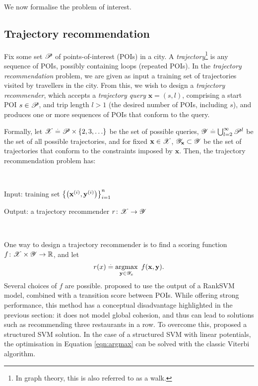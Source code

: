 
We now formalise the problem of interest.

%
\subsection{Trajectory recommendation}

Fix some set $\mathscr{P}$ of points-of-interest (POIs) in a city.
A \emph{trajectory}\footnote{In graph theory, this is also referred to as a walk.} is any sequence of POIs, possibly containing loops (repeated POIs).
In the \emph{trajectory recommendation} problem, we are given as input a training set of trajectories visited by travellers in the city.
From this, we wish to design a \emph{trajectory recommender}, which accepts a
\emph{trajectory query} $\mathbf{x} = (s, l)$, comprising a start POI $s \in \mathscr{P}$, and trip length $l \!>\! 1$ (\ie the desired number of POIs, including $s$),
and produces one or more sequences of POIs that conform to the query.

Formally, let $\mathscr{X} \stackrel{.}{=} \mathscr{P} \times \{ 2, 3, \ldots \}$ be the set of possible queries,
$\mathscr{Y} \stackrel{.}{=} \bigcup_{l = 2}^\infty \mathscr{P}^l$ be the set of all possible trajectories,
and for fixed $\mathbf{x} \in \mathscr{X}$, $\mathscr{Y}_{\mathbf{x}} \subset \mathscr{Y}$ be the set of trajectories that conform to the constraints imposed by $\mathbf{x}$.
Then, the {trajectory recommendation} problem has:

\

{\sc Input}: training set $\left\{ \left( \mathbf{x}^{(i)}, \mathbf{y}^{(i)} \right) \right\}_{i = 1}^n$ %

{\sc Output}: a trajectory recommender $r \colon \mathscr{X} \to \mathscr{Y}$ 

\

One way to design a trajectory recommender is to find a scoring function $f \colon \mathscr{X} \times \mathscr{Y} \to \mathbb{R}$, and let
\begin{equation}
	\label{eqn:argmax}
	r( x ) \stackrel{.}{=} \operatorname*{argmax}_{\mathbf{y} \in \mathscr{Y}_x}~f(\mathbf{x}, \mathbf{y}).
\end{equation}
Several choices of $f$ are possible.
\citet{cikm16paper} proposed to use the output of a RankSVM model, combined with a transition score between POIs.
While offering strong performance, this method has a conceptual disadvantage highlighted in the previous section:
it does not model global cohesion, and thus can lead to solutions such as recommending three restaurants in a row.
To overcome this, \citet{Chen:2017} proposed a structured SVM solution.
In the case of a structured SVM with linear potentials, the optimisation in Equation \ref{eqn:argmax} can be solved with the classic Viterbi algorithm.


